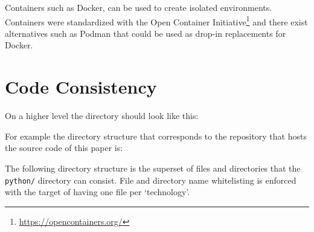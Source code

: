 \documentclass[journal]{IEEEtran}
\begin{document}
Containers such as Docker, can be used to create isolated environments.
Containers were standardized with the Open Container Initiative\footnote{\url{https://opencontainers.org/}} and there exist alternatives such as Podman that could be used as drop-in replacements for Docker.

\section{Code Consistency}
On a higher level the directory should look like this:

For example the directory structure that corresponds to the repository that hosts the source code of this paper is:

The following directory structure is the superset of files and directories that the \texttt{python/} directory can consist.
File and directory name whitelisting is enforced with the target of having one file per `technology'.
\end{document}
